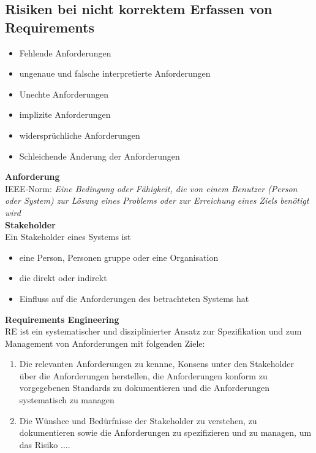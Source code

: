 \documentclass{report}
\theoremstyle{definition}
\theoremstyle{example}
\begin{document}
\subsection{Risiken bei nicht korrektem Erfassen von Requirements}
\begin{itemize}
   \item Fehlende Anforderungen
   \item ungenaue und falsche interpretierte Anforderungen
   \item Unechte Anforderungen
   \item implizite Anforderungen
   \item widersprüchliche Anforderungen
   \item Schleichende Änderung der Anforderungen
\end{itemize}

\textbf{Anforderung}\\
IEEE-Norm: \textit{Eine Bedingung oder Fähigkeit, die von einem Benutzer (Person oder System) zur Lösung eines Problems oder zur Erreichung eines Ziels benötigt wird}\\

\textbf{Stakeholder}\\
Ein Stakeholder eines Systems ist
\begin{itemize}
   \item eine Person, Personen gruppe oder eine Organisation
   \item die direkt oder indirekt 
   \item Einfluss auf die Anforderungen des betrachteten Systems hat 
\end{itemize}

\textbf{Requirements Engineering}\\
RE ist ein systematischer und disziplinierter Ansatz zur Spezifikation und zum Management von Anforderungen mit folgenden Ziele:
\begin{enumerate}
   \item Die relevanten Anforderungen zu kennne, Konsens unter den Stakeholder über die Anforderungen herstellen, die Anforderungen konform zu vorgegebenen Standards zu dokumentieren und die Anforderungen systematisch zu managen 
   \item Die Wünshce und Bedürfnisse der Stakeholder zu verstehen, zu dokumentieren sowie die Anforderungen zu spezifizieren und zu managen, um das Risiko ....
\end{enumerate}
\end{document}
